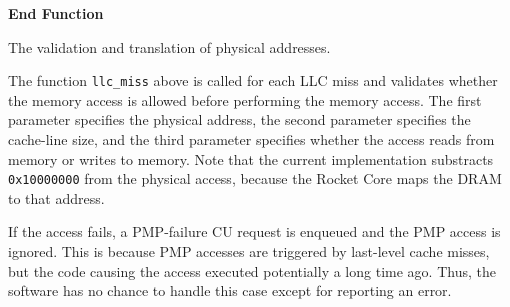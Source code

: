 \begin{algorithm}[H]
    \textbf{End Function}
    \caption{The validation and translation of physical addresses.}
    \label{code:pmp}
\end{algorithm}

\noindent The function \texttt{llc\_miss} above is called for each LLC miss and validates whether
the memory access is allowed before performing the memory access. The first parameter specifies the
physical address, the second parameter specifies the cache-line size, and the third parameter
specifies whether the access reads from memory or writes to memory. Note that the current
implementation substracts \texttt{0x10000000} from the physical access, because the Rocket Core maps
the DRAM to that address.

If the access fails, a PMP-failure CU request is enqueued and the PMP access is ignored. This is
because PMP accesses are triggered by last-level cache misses, but the code causing the access
executed potentially a long time ago. Thus, the software has no chance to handle this case except
for reporting an error.
\extend{}
